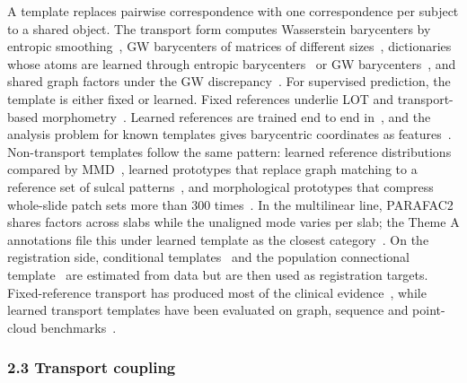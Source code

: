 \documentclass[journal,onecolumn]{IEEEtran}
\begin{document}
A template replaces pairwise correspondence with one correspondence per subject to a shared object. The transport form computes Wasserstein barycenters by entropic smoothing~\cite{CuturiDoucet2014Fast}, GW barycenters of matrices of different sizes~\cite{Peyre2016Gromov}, dictionaries whose atoms are learned through entropic barycenters~\cite{Schmitz2018Wasserstein} or GW barycenters~\cite{VincentCuaz2021Online}, and shared graph factors under the GW discrepancy~\cite{Xu2023Representing}. For supervised prediction, the template is either fixed or learned. Fixed references underlie LOT and transport-based morphometry~\cite{Wang2013Linear,Moosmuller2023Linear,ShifatERabbi2025Linear,Kundu2018Discovery,Kundu2020Enabling,Kundu2024Discovering,Ironside2025Predictive}. Learned references are trained end to end in~\cite{Mialon2021Trainable,Kolouri2021Wasserstein,VincentCuaz2022Template,BrogatMotte2022Learning}, and the analysis problem for known templates gives barycentric coordinates as features~\cite{Mallery2025Synthesis,DiazMartin2026Gromov}. Non-transport templates follow the same pattern: learned reference distributions compared by MMD~\cite{Wang2024Graph}, learned prototypes that replace graph matching to a reference set of sulcal patterns~\cite{Kwon2025Graph}, and morphological prototypes that compress whole-slide patch sets more than 300 times~\cite{Song2024Multimodal}. In the multilinear line, PARAFAC2 shares factors across slabs while the unaligned mode varies per slab; the Theme A annotations file this under learned template as the closest category~\cite{Kiers1999PARAFAC2,Roald2022AOADMM,Ren2023MULTIPAR,Konyar2025SemiSupervised,Schenker2025PARAFAC2CMTF,Patalano2026PAR2COX}. On the registration side, conditional templates~\cite{Rakic2026AtlasMorph} and the population connectional template~\cite{Gurler2023Template} are estimated from data but are then used as registration targets. Fixed-reference transport has produced most of the clinical evidence~\cite{Kundu2018Discovery,Kundu2020Enabling,Kundu2024Discovering,Ironside2025Predictive}, while learned transport templates have been evaluated on graph, sequence and point-cloud benchmarks~\cite{Mialon2021Trainable,Kolouri2021Wasserstein,VincentCuaz2022Template,BrogatMotte2022Learning,Mallery2025Synthesis}.

\subsubsection{2.3 Transport coupling}
\end{document}
